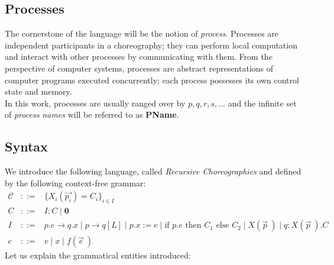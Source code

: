 \documentclass[12pt,a4paper,twoside]{book}
\begin{document}
\subsection{Processes}
The cornerstone of the language will be the notion of \textit{process}. Processes are independent participants in a choreography; they can perform local computation and interact with other processes by communicating with them. From the perspective of computer systems, processes are abstract representations of computer programs executed concurrently; each process possesses its own control state and memory.\\
In this work, processes are usually ranged over by $p, q, r, s, \ldots$ and the infinite set of \textit{process names} will be referred to as \textbf{PName}.

\subsection{Syntax}
We introduce the following language, called \textit{Recursive Choreographies} and defined by the following context-free grammar:
$$
\begin{array}{rcl}
\mathscr{C} & ::= & \{X_i(\vec{p_i}) = C_i\}_{i \in I} \\
C & ::= & I; C \mid \boldsymbol{0} \\
I & ::= & p.e \rightarrow q.x \mid p \rightarrow q[L] \mid p.x := e \mid \text{if } p.e \text{ then } C_1 \text{ else } C_2 \mid X(\vec{p}~) \mid q : X(\vec{p}~).C\\
e & ::= & v \mid x \mid f(\vec{e}~)
\end{array}
$$
Let us explain the grammatical entities introduced:
\end{document}
